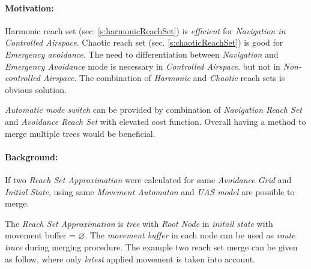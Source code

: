 \paragraph{Motivation:} Harmonic reach set (sec. \ref{s:harmonicReachSet}) is \emph{efficient} for \emph{Navigation in \emph{Controlled Airspace}}. Chaotic reach set (sec. \ref{s:chaoticReachSet}) is good for \emph{Emergency avoidance}. The need to differentiation between \emph{Navigation} and \emph{Emergency Avoidance} mode is necessary in \emph{Controlled Airspace}. but not in \emph{Non-controlled Airspace}. The combination of \emph{Harmonic} and \emph{Chaotic} reach sets is obvious solution. 

\emph{Automatic mode switch} can be provided by combination of \emph{Navigation Reach Set} and \emph{Avoidance Reach Set} with elevated cost function. Overall having a method to merge multiple trees would be beneficial.

\paragraph{Background:} If two \emph{Reach Set Approximation} were calculated for same \emph{Avoidance Grid} and \emph{Initial State}, using same \emph{Movement Automaton} and \emph{UAS model} are possible to merge. 

The \emph{Reach Set Approximation} is \emph{tree} with \emph{Root Node} in \emph{initail state} with movement buffer = $\varnothing$. The \emph{movement buffer} in each node can be used as \emph{route trace} during merging procedure. The example two reach set merge can be given as follow, where only \emph{latest} applied movement is taken into account.

